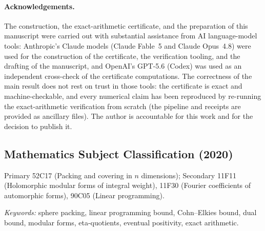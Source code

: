 \documentclass[11pt]{article}
\theoremstyle{remark}
\begin{document}
\paragraph*{Acknowledgements.} The construction, the exact-arithmetic
certificate, and the preparation of this manuscript were carried out with
substantial assistance from AI language-model tools: Anthropic's Claude
models (Claude Fable~5 and Claude Opus~4.8) were used for the construction
of the certificate, the verification tooling, and the drafting of the
manuscript, and OpenAI's GPT-5.6 (Codex) was used as an independent
cross-check of the certificate computations. The
correctness of the main result does not rest on trust in those tools: the
certificate is exact and machine-checkable, and every numerical claim has
been reproduced by re-running the exact-arithmetic verification from
scratch (the pipeline and receipts are provided as ancillary files). The
author is accountable for this work and for the decision to publish it.

\subsection*{Mathematics Subject Classification (2020)}
Primary 52C17 (Packing and covering in $n$ dimensions);
Secondary 11F11 (Holomorphic modular forms of integral weight),
11F30 (Fourier coefficients of automorphic forms),
90C05 (Linear programming).

\medskip\noindent\emph{Keywords:} sphere packing, linear programming
bound, Cohn--Elkies bound, dual bound, modular forms, eta-quotients,
eventual positivity, exact arithmetic.
\end{document}
